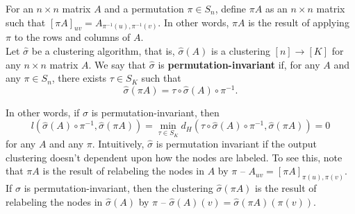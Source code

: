 \message{ !name(paper_all_in_one.tex)}\documentclass{article}
\begin{document}



\begin{definition}
For an $n \times n$ matrix $A$ and a permutation $\pi \in S_n$, define $\pi A$ as an $n \times n$ matrix such that $[\pi A]_{uv} = A_{\pi^{-1}(u), \pi^{-1}(v)}$. In other words, $\pi A$ is the result of applying $\pi$ to the rows and columns of $A$. \\

\noindent Let $\hat{\sigma}$ be a clustering algorithm, that is, $\hat{\sigma}(A)$ is a clustering $[n] \rightarrow [K]$ for any $n \times n$ matrix $A$. We say that $\hat{\sigma}$ is \textbf{permutation-invariant} if, for any $A$ and any $\pi \in S_n$, there exists $\tau \in S_K$ such that $$ \hat{\sigma}(\pi A) = \tau \circ \hat{\sigma}(A) \circ \pi^{-1}.$$
\end{definition}

In other words, if $\hat{\sigma}$ is permutation-invariant, then 
$$l(\hat{\sigma}(A) \circ \pi^{-1}, \hat{\sigma}(\pi A)) = 
     \min_{\tau \in S_K} d_H(\tau \circ \hat{\sigma}(A) \circ \pi^{-1}, \hat{\sigma}(\pi A)) = 0$$ 
for any $A$ and any $\pi$. Intuitively, $\hat{\sigma}$ is permutation invariant if the output clustering doesn't dependent upon how the nodes are labeled. To see this, note that $\pi A$ is the result of relabeling the nodes in $A$ by $\pi$ -- $A_{uv} = [\pi A]_{\pi(u), \pi(v)}$. If $\hat{\sigma}$ is permutation-invariant, then the clustering $\hat{\sigma}(\pi A)$ is the result of relabeling the nodes in $\hat{\sigma}(A)$ by $\pi$ -- $\hat{\sigma}(A)(v) = \hat{\sigma}(\pi A)(\pi(v))$.



\end{document}
